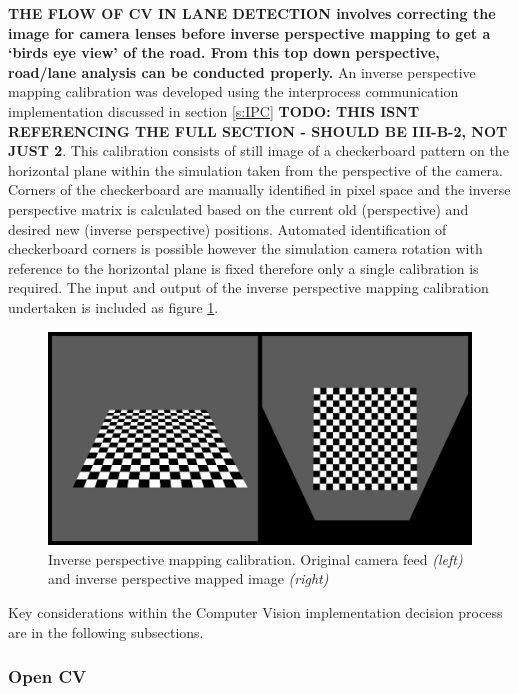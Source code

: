 \documentclass[]{aiaa-tc}%
\begin{document}
\textbf{THE FLOW OF CV IN LANE DETECTION involves correcting the image for camera lenses before inverse perspective mapping to get a `birds eye view' of the road. From this top down perspective, road/lane analysis can be conducted properly.} An inverse perspective mapping calibration was developed using the interprocess communication implementation discussed in section \ref{s:IPC} \textbf{TODO: THIS ISNT REFERENCING THE FULL SECTION - SHOULD BE III-B-2, NOT JUST 2}. This calibration consists of still image of a checkerboard pattern on the horizontal plane within the simulation taken from the perspective of the camera. Corners of the checkerboard are manually identified in pixel space and the inverse perspective matrix is calculated based on the current old (perspective) and desired new (inverse perspective) positions. Automated identification of checkerboard corners is possible however the simulation camera rotation with reference to the horizontal plane is fixed therefore only a single calibration is required. The input and output of the inverse perspective mapping calibration undertaken is included as figure \ref{f:inverse_perspective_calibration}.

\begin{figure}[htb]%
	\includegraphics{InversePerspectiveEg.png}
	\caption{Inverse perspective mapping calibration. Original camera feed \textit{(left)} and inverse perspective mapped image \textit{(right)}}
	\label{f:inverse_perspective_calibration}
\end{figure}

Key considerations within the Computer Vision implementation decision process are in the following subsections.

\subsubsection{Open CV}\label{s:openCV}
\end{document}

